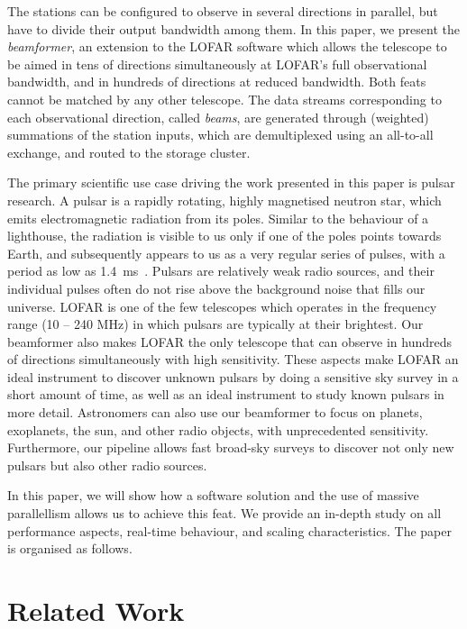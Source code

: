 \documentclass{llncs}
\begin{document}
The stations can be configured to observe in several directions in parallel, but have to divide their output bandwidth among them. In this paper, we present the \emph{beamformer}, an extension to the LOFAR software which allows the telescope to be aimed in tens of directions simultaneously at LOFAR's full observational bandwidth, and in hundreds of directions at reduced bandwidth. Both feats cannot be matched by any other telescope. The data streams corresponding to each observational direction, called \emph{beams}, are generated through (weighted) summations of the station inputs, which are demultiplexed using an all-to-all exchange, and routed to the storage cluster.

The primary scientific use case driving the work presented in this paper is pulsar research. A pulsar is a rapidly rotating, highly magnetised neutron star, which emits electromagnetic radiation from its poles. Similar to the behaviour of a lighthouse, the radiation is visible to us only if one of the poles points towards Earth, and subsequently appears to us as a very regular series of pulses, with a period as low as 1.4~ms~\cite{Hessels:06}. Pulsars are relatively weak radio sources, and their individual pulses often do not rise above the background noise that fills our universe. LOFAR is one of the few telescopes which operates in the frequency range (10 -- 240 MHz) in which pulsars are typically at their brightest. Our beamformer also makes LOFAR the only telescope that can observe in hundreds of directions simultaneously with high sensitivity. These aspects make LOFAR an ideal instrument to discover unknown pulsars by doing a sensitive sky survey in a short amount of time, as well as an ideal instrument to study known pulsars in more detail. Astronomers can also use our beamformer to focus on planets, exoplanets, the sun, and other radio objects, with unprecedented sensitivity. Furthermore, our pipeline allows fast broad-sky surveys to discover not only new pulsars but also other radio sources.

In this paper, we will show how a software solution and the use of massive parallellism allows us to achieve this feat. We provide an in-depth study on all performance aspects, real-time behaviour, and scaling characteristics. The paper is organised as follows.

\section{Related Work}
\end{document}
